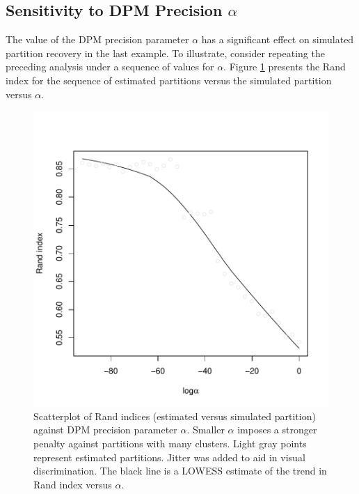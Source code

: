 \documentclass[article, nojss]{jss}
\begin{document}
\subsection[Sensitivity]{Sensitivity to DPM Precision $\alpha$}

The value of the DPM precision parameter $\alpha$ has a significant effect on simulated partition recovery in the last example. To illustrate, consider repeating the preceding analysis under a sequence of values for $\alpha$. Figure \ref{fig:sim3} presents the Rand index for the sequence of estimated partitions versus the simulated partition versus $\alpha$.


\begin{Schunk}
\end{Schunk}

\begin{figure}[h!]
\begin{center}
\includegraphics{profdpm-010}
\end{center}
\caption{Scatterplot of Rand indices (estimated versus simulated partition) against DPM precision parameter $\alpha$. Smaller $\alpha$ imposes a stronger penalty against partitions with many clusters. Light gray points represent estimated partitions. Jitter was added to aid in visual discrimination. The black line is a LOWESS estimate of the trend in Rand index versus $\alpha$. \label{fig:sim3}}
\end{figure}
\end{document}
